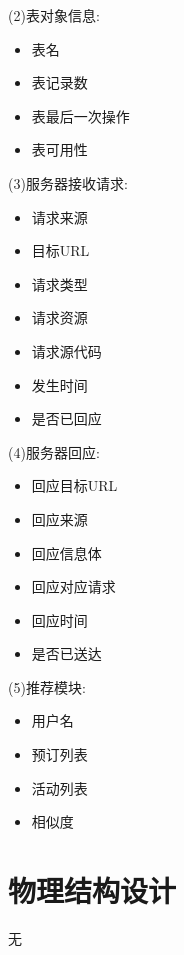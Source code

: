 (2)表对象信息:
\begin{itemize}
    \item 表名
    \item 表记录数
    \item 表最后一次操作
    \item 表可用性
\end{itemize}


(3)服务器接收请求:
\begin{itemize}
    \item 请求来源
    \item 目标URL
    \item 请求类型
    \item 请求资源
    \item 请求源代码
    \item 发生时间
    \item 是否已回应
\end{itemize}


(4)服务器回应:
\begin{itemize}
    \item 回应目标URL
    \item 回应来源
    \item 回应信息体
    \item 回应对应请求
    \item 回应时间
    \item 是否已送达
\end{itemize}


(5)推荐模块:
\begin{itemize}
    \item 用户名
    \item 预订列表
    \item 活动列表
    \item 相似度
\end{itemize}


\section{物理结构设计}
无


